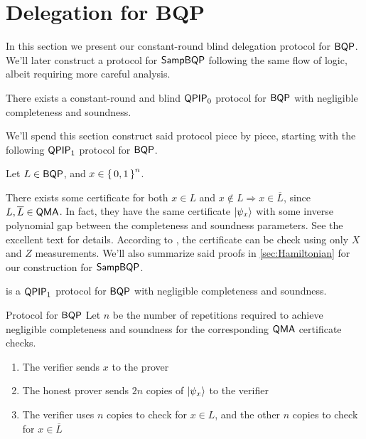 \section{Delegation for BQP}
\label{sec:BlindBQP}

In this section we present our constant-round blind delegation protocol for $\operatorname{\mathsf{BQP}}$.
We'll later construct a protocol for $\operatorname{\mathsf{SampBQP}}$ following the same flow of logic, albeit requiring more careful analysis.

\begin{thm}
	There exists a constant-round and blind $\operatorname{\mathsf{QPIP}}_0$ protocol for $\operatorname{\mathsf{BQP}}$ with negligible completeness and soundness.
\end{thm}

We'll spend this section construct said protocol piece by piece, starting with the following $\operatorname{\mathsf{QPIP}}_1$ protocol for $\operatorname{\mathsf{BQP}}$.

Let $L\in\operatorname{\mathsf{BQP}}$, and $x\in\set{0,1}^n$.

There exists some certificate for both $x\in L$ and $x\notin L\Rightarrow x\in\overline{L}$, since $L, \overline{L}\in\operatorname{\mathsf{QMA}}$.
In fact, they have the same certificate $\ket{\psi_x}$ with some inverse polynomial gap between the completeness and soundness parameters.
See the excellent text \cite{kitaev2002classical} for details.
According to \cite{PhysRevA.93.022326}, the certificate can be check using only $X$ and $Z$ measurements.
We'll also summarize said proofs in \cref{sec:Hamiltonian} for our construction for $\operatorname{\mathsf{SampBQP}}$.

\begin{thm}
	 is a $\operatorname{\mathsf{QPIP}}_1$ protocol for $\operatorname{\mathsf{BQP}}$ with negligible completeness and soundness.
\end{thm}

\begin{protocol}{Protocol for $\operatorname{\mathsf{BQP}}$}
	\label{proto:BQP}
	Let $n$ be the number of repetitions required to achieve negligible completeness and soundness for the corresponding $\operatorname{\mathsf{QMA}}$ certificate checks.
	\begin{enumerate}
		\item The verifier sends $x$ to the prover
		\item The honest prover sends $2n$ copies of $\ket{\psi_x}$ to the verifier
		\item The verifier uses $n$ copies to check for $x\in L$, and the other $n$ copies to check for $x\in\overline{L}$
	\end{enumerate}
\end{protocol}

